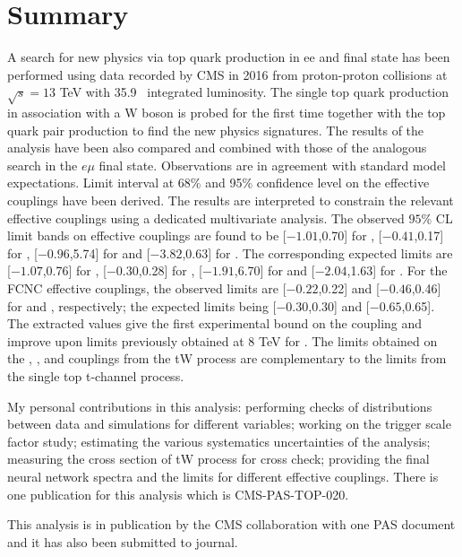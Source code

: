 \clearpage
\section{Summary}
\label{sec:tW_summary}

A search for new physics via top quark production in ee and \mumu final state has been performed using data recorded by CMS in 2016 from proton-proton collisions at $\sqrt{s} = 13$ TeV with 35.9 \fbinv\ integrated luminosity. The single top quark production in association with a W boson is probed for the first time together with the top quark pair production to find the new physics signatures. The results of the analysis have been also compared and combined with those of the analogous search in the $e\mu$ final state.
Observations are in agreement with standard model expectations. Limit interval at 68\% and 95\% confidence level on the effective couplings have been derived.
The results are interpreted to constrain the relevant effective couplings using a dedicated multivariate analysis. The observed $95\%$ CL limit bands on effective couplings are found to be [$-1.01$,0.70] for \CG, [$-0.41$,0.17]  for \CtG, [$-0.96$,5.74]  for \CtW and [$-3.82$,0.63] for \Cphiq. The corresponding expected limits are [$-1.07$,0.76] for \CG, [$-0.30$,0.28] for \CtG, [$-1.91$,6.70] for \CtW and [$-2.04$,1.63] for \Cphiq. For the FCNC effective couplings, the observed limits are [$-0.22$,0.22] and [$-0.46$,0.46] for \CuG and \CcG, respectively; the expected limits being [$-0.30$,0.30] and [$-0.65$,0.65]. The extracted values give the first experimental bound on the \CG coupling and  improve upon limits previously obtained at 8 TeV for \CtG. The limits obtained on the \CtW, \Cphiq, \CuG and \CcG couplings from the tW process are complementary to the limits from the single top t-channel process.

My personal contributions in this analysis: performing checks of distributions between data and simulations for different variables; working on the trigger scale factor study; estimating the various systematics uncertainties of the analysis; measuring the cross section of tW process for cross check; providing the final neural network spectra and the limits for different effective couplings. There is one publication for this analysis which is CMS-PAS-TOP-020.

This analysis is in publication by the CMS collaboration with one PAS document \cite{CMS-PAS-TOP-17-020} and it has also been submitted to journal.


